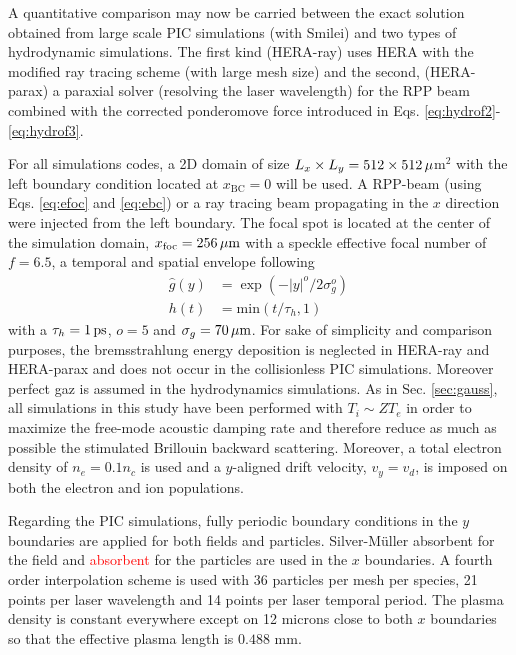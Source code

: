 \documentclass[%
 reprint,
 amsmath,amssymb,
 aps,
]{revtex4-1}
\begin{document}
A quantitative comparison may now be carried between the  
exact solution obtained from large scale PIC simulations (with Smilei) and two types of  hydrodynamic simulations.
The first kind (HERA-ray) uses   HERA   with the modified ray tracing scheme (with large mesh size) and the second,  (HERA-parax) a paraxial solver (resolving the laser wavelength) for the RPP beam combined with the corrected ponderomove force introduced in Eqs. \eqref{eq:hydrof2}-\eqref{eq:hydrof3}. 

For all simulations codes, a 2D domain of size $L_x \times L_y = 512 \times 512\, \rm \mu$m$^2$ with the left boundary condition located at $x_\mathrm{BC}=0$ will be used. 
A RPP-beam (using Eqs. \eqref{eq:efoc} and  \eqref{eq:ebc}) or a ray tracing beam propagating in the $x$ direction were injected from the left boundary.
The focal spot is located at the center of the simulation domain, $x_\mathrm{foc}=256\, \rm \mu m$ with a speckle effective focal number of $f = 6.5$, a temporal
and spatial envelope following
\begin{align}
    \hat{g}(y) &= \exp(-\vert y\vert ^o/2\sigma_g^o)  \,  \\
    h(t) &= \mathrm{min}(t/\tau_h,1) \,
\end{align}
with a $\tau_h=1\, \rm ps$,  $o=5$ and $\sigma_g = 70\,\rm \mu m$. 
For sake of simplicity and comparison purposes, the bremsstrahlung energy deposition is neglected in HERA-ray and HERA-parax and does not occur in the collisionless PIC simulations.  Moreover perfect gaz is assumed in the hydrodynamics simulations.
As in Sec. \ref{sec:gauss}, all simulations in this study have been performed with $T_i \sim ZT_e$ in order to maximize the free-mode acoustic damping rate and therefore reduce as much as possible the stimulated Brillouin backward scattering. Moreover,  a total electron density of $n_e =0.1n_c $ is used  and a $y$-aligned drift velocity, $v_y=v_d$, is imposed on both the electron and ion populations.


Regarding the PIC simulations,  fully periodic boundary  conditions in the $y$ boundaries are applied for both fields and particles. Silver-M\"uller absorbent for the field and \textcolor{red}{absorbent} for the particles are used in the $x$ boundaries.  
A fourth order interpolation scheme is used with 36 particles per mesh per species, 21 points per laser wavelength and 14 points per laser temporal period. The plasma density is constant everywhere except on 12 microns close to both $x$ boundaries so that the effective plasma length is $0.488$  mm.
\end{document}
